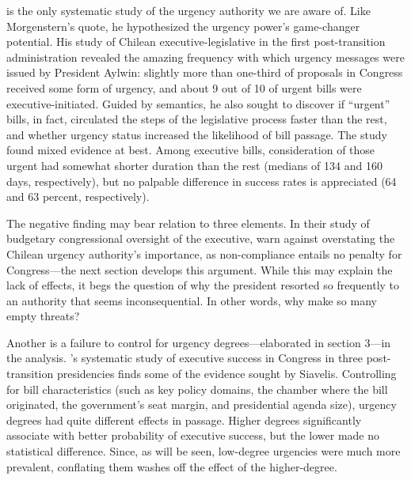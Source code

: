 \documentclass[letter,12pt]{article}
\begin{document}
\citet{siavelis.2002} is the only systematic study of the urgency authority we are aware of. Like Morgenstern's quote, he hypothesized the urgency power's game-changer potential. His study of Chilean executive-legislative in the first post-transition administration revealed the amazing frequency with which urgency messages were issued by President Aylwin: slightly more than one-third of proposals in Congress received some form of urgency, and about 9 out of 10 of urgent bills were executive-initiated. Guided by semantics, he also sought to discover if ``urgent'' bills, in fact, circulated the steps of the legislative process faster than the rest, and whether urgency status increased the likelihood of bill passage. The study found mixed evidence at best. Among executive bills, consideration of those urgent had somewhat shorter duration than the rest (medians of 134 and 160 days, respectively), but no palpable difference in success rates is appreciated (64 and 63 percent, respectively). 

The negative finding may bear relation to three elements. In their study of budgetary congressional oversight of the executive, \citet{berrios.gamboa.fiscChile.2006} warn against overstating the Chilean urgency authority's importance, as non-compliance entails no penalty for Congress---the next section develops this argument. While this may explain the lack of effects, it begs the question of why the president resorted so frequently to an authority that seems inconsequential. In other words, why make so many empty threats?

Another is a failure to control for urgency degrees---elaborated in section 3---in the analysis. \citeauthor{aleman.navia.UrgChi.2009}'s \citeyearpar{aleman.navia.UrgChi.2009} systematic study of executive success in Congress in three post-transition presidencies finds some of the evidence sought by Siavelis. Controlling for bill characteristics (such as key policy domains, the chamber where the bill originated, the government's seat margin, and presidential agenda size), urgency degrees had quite different effects in passage. Higher degrees significantly associate with better probability of executive success, but the lower made no statistical difference. Since, as will be seen, low-degree urgencies were much more prevalent, conflating them washes off the effect of the higher-degree. 
\end{document}
